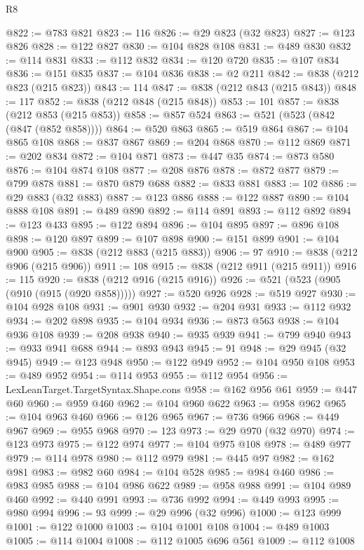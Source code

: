 \begin{lexlean}{R8}
\begin{coremodule}
@822 := @783 @821
@823 := 116
@826 := @29 @823 (@32 @823)
@827 := @123 @826
@828 := @122 @827
@830 := @104 @828 @108
@831 := @489 @830
@832 := @114 @831
@833 := @112 @832
@834 := @120 @720
@835 := @107 @834
@836 := @151 @835
@837 := @104 @836
@838 := @2 @211
@842 := @838 (@212 @823 (@215 @823))
@843 := 114
@847 := @838 (@212 @843 (@215 @843))
@848 := 117
@852 := @838 (@212 @848 (@215 @848))
@853 := 101
@857 := @838 (@212 @853 (@215 @853))
@858 := @857 @524
@863 := @521 (@523 (@842 (@847 (@852 @858))))
@864 := @520 @863
@865 := @519 @864
@867 := @104 @865 @108
@868 := @837 @867
@869 := @204 @868
@870 := @112 @869
@871 := @202 @834
@872 := @104 @871
@873 := @447 @35
@874 := @873 @580
@876 := @104 @874 @108
@877 := @208 @876
@878 := @872 @877
@879 := @799 @878
@881 := @870 @879 @688
@882 := @833 @881
@883 := 102
@886 := @29 @883 (@32 @883)
@887 := @123 @886
@888 := @122 @887
@890 := @104 @888 @108
@891 := @489 @890
@892 := @114 @891
@893 := @112 @892
@894 := @123 @433
@895 := @122 @894
@896 := @104 @895
@897 := @896 @108
@898 := @120 @897
@899 := @107 @898
@900 := @151 @899
@901 := @104 @900
@905 := @838 (@212 @883 (@215 @883))
@906 := 97
@910 := @838 (@212 @906 (@215 @906))
@911 := 108
@915 := @838 (@212 @911 (@215 @911))
@916 := 115
@920 := @838 (@212 @916 (@215 @916))
@926 := @521 (@523 (@905 (@910 (@915 (@920 @858)))))
@927 := @520 @926
@928 := @519 @927
@930 := @104 @928 @108
@931 := @901 @930
@932 := @204 @931
@933 := @112 @932
@934 := @202 @898
@935 := @104 @934
@936 := @873 @563
@938 := @104 @936 @108
@939 := @208 @938
@940 := @935 @939
@941 := @799 @940
@943 := @933 @941 @688
@944 := @893 @943
@945 := 91
@948 := @29 @945 (@32 @945)
@949 := @123 @948
@950 := @122 @949
@952 := @104 @950 @108
@953 := @489 @952
@954 := @114 @953
@955 := @112 @954
@956 := LexLeanTarget.TargetSyntax.Shape.cons
@958 := @162 @956 @61
@959 := @447 @60
@960 := @959 @460
@962 := @104 @960 @622
@963 := @958 @962
@965 := @104 @963 @460
@966 := @126 @965
@967 := @736 @966
@968 := @449 @967
@969 := @955 @968
@970 := 123
@973 := @29 @970 (@32 @970)
@974 := @123 @973
@975 := @122 @974
@977 := @104 @975 @108
@978 := @489 @977
@979 := @114 @978
@980 := @112 @979
@981 := @445 @97
@982 := @162 @981
@983 := @982 @60
@984 := @104 @528
@985 := @984 @460
@986 := @983 @985
@988 := @104 @986 @622
@989 := @958 @988
@991 := @104 @989 @460
@992 := @440 @991
@993 := @736 @992
@994 := @449 @993
@995 := @980 @994
@996 := 93
@999 := @29 @996 (@32 @996)
@1000 := @123 @999
@1001 := @122 @1000
@1003 := @104 @1001 @108
@1004 := @489 @1003
@1005 := @114 @1004
@1008 := @112 @1005 @696 @561
@1009 := @112 @1008

\end{coremodule}
\end{lexlean}
